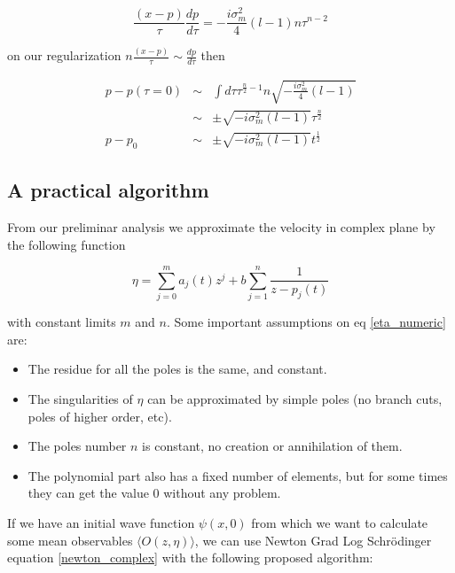 \documentclass[a4paper,12pt]{article}
\begin{document}
\begin{equation}
\frac{(x-p)}{\tau} \frac{d p}{d \tau} =  - \frac{i \sigma_m^2}{4} (l-1) n \tau^{n-2}
\end{equation}

on our regularization $n\frac{(x-p)}{\tau} \sim \frac{d p}{d \tau} $ then

\begin{eqnarray}
p - p(\tau=0) &\sim&  \int d\tau \tau^{\frac{n}{2} -1 }n\sqrt{- \frac{i \sigma_m^2}{4} (l-1)} \nonumber \\
&\sim& \pm \sqrt{- i \sigma_m^2 (l-1) }  \tau^{\frac{n}{2}} \nonumber \\
p - p_0&\sim& \pm \sqrt{- i \sigma_m^2 (l-1) } t^{\frac{1}{2}}
\end{eqnarray}




\subsection{A practical algorithm}

From our preliminar analysis we approximate the velocity in complex plane by the following function

\begin{equation}\label{eta_numeric}
\eta = \sum_{j=0}^{m} a_j(t) z^j + b \sum_{j=1}^{n} \frac{1}{z - p_j(t)}
\end{equation}

with constant limits $m$ and $n$. Some important assumptions on eq \ref{eta_numeric} are:

\begin{itemize}
\item The residue for all the poles is the same, and constant.
\item The singularities of $\eta$ can be approximated by simple poles (no branch cuts, poles of higher order, etc).
\item The poles number $n$ is constant, no creation or annihilation of them.
\item The polynomial part also has a fixed number of elements, but for some times they can get the value $0$ without any problem.
\end{itemize}


If we have an initial wave function $\psi(x,0)$ from which we want to calculate some mean observables $\langle O(z,\eta) \rangle$, we can 
 use Newton Grad Log Schr\"odinger equation \ref{newton_complex} with the following proposed algorithm:
\end{document}
